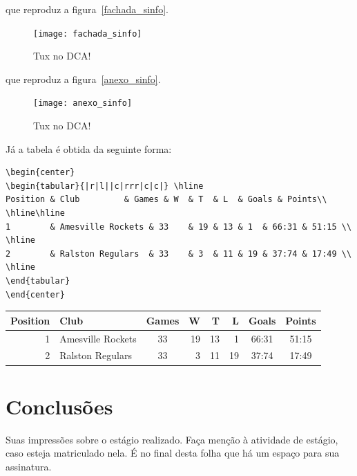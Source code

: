 \documentclass[a4paper, 12pt]{article}
\begin{document}
que reproduz a figura~\ref{fachada_sinfo}.
\begin{figure}[htb!]
\begin{center}
\texttt{[image: fachada\_sinfo]}
\end{center}
\caption{Tux no DCA!}
\label{tux}
\end{figure}

que reproduz a figura~\ref{anexo_sinfo}.
\begin{figure}[htb!]
\begin{center}
\texttt{[image: anexo\_sinfo]}
\end{center}
\caption{Tux no DCA!}
\label{tux}
\end{figure}

Já a tabela é obtida da seguinte forma:
\small
\begin{verbatim}
\begin{center}
\begin{tabular}{|r|l||c|rrr|c|c|} \hline
Position & Club         & Games & W  & T  & L  & Goals & Points\\ \hline\hline
1        & Amesville Rockets & 33    & 19 & 13 & 1  & 66:31 & 51:15 \\ \hline
2        & Ralston Regulars  & 33    & 3  & 11 & 19 & 37:74 & 17:49 \\ \hline
\end{tabular}
\end{center}
\end{verbatim}
\normalsize

\begin{center}
\begin{tabular}{|r|l||c|rrr|c|c|} \hline
Position & Club              & Games & W  & T  & L  & Goals & Points\\ \hline\hline
1        & Amesville Rockets & 33    & 19 & 13 & 1  & 66:31 & 51:15 \\ \hline
2        & Ralston Regulars  & 33    & 3  & 11 & 19 & 37:74 & 17:49 \\ \hline
\end{tabular}
\end{center}

\newpage

\section{Conclusões}

Suas impressões sobre o estágio realizado. Faça menção à atividade de estágio, caso esteja matriculado nela. É no final desta folha que há um espaço para sua assinatura.
\end{document}
